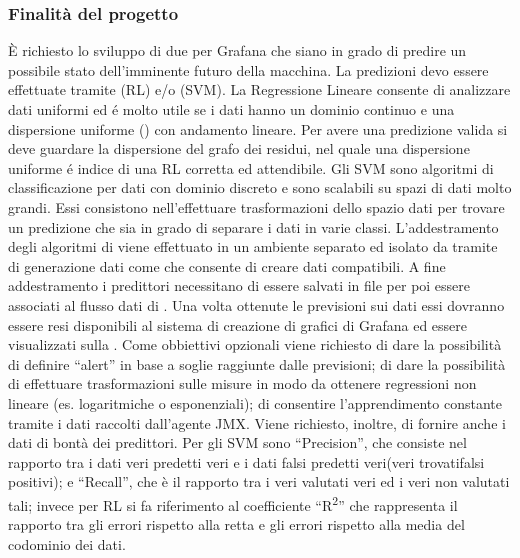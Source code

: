		\subsubsection{Finalità del progetto}
			È richiesto lo sviluppo di due  per Grafana che siano in grado di predire un possibile stato dell'imminente futuro della macchina. La predizioni devo essere effettuate tramite  (RL) e/o  (SVM).
			La Regressione Lineare consente di analizzare dati uniformi ed é molto utile se i dati hanno un dominio continuo e una dispersione uniforme () con andamento lineare. Per avere una predizione valida si deve guardare la dispersione del grafo dei residui, nel quale una dispersione uniforme é indice di una RL corretta ed attendibile.
			Gli SVM sono algoritmi di classificazione per dati con dominio discreto e sono scalabili su spazi di dati molto grandi. Essi consistono nell'effettuare trasformazioni dello spazio dati per trovare un predizione che sia in grado di separare i dati in varie classi.
			L'addestramento degli algoritmi di  viene effettuato in un ambiente separato ed isolato da  tramite  di generazione dati come  che consente di creare dati compatibili. A fine addestramento i predittori necessitano di essere salvati in file  per poi essere associati al flusso dati di . Una volta ottenute le previsioni sui dati essi dovranno essere resi disponibili al sistema di creazione di grafici di Grafana ed essere visualizzati sulla .
			\newline
			Come obbiettivi opzionali viene richiesto di dare la possibilità di definire ``alert'' in base a soglie raggiunte dalle previsioni; di dare la possibilità di effettuare trasformazioni sulle misure in modo da ottenere regressioni non lineare (es. logaritmiche o esponenziali); di consentire l'apprendimento constante tramite i dati raccolti dall'agente JMX. Viene richiesto, inoltre, di fornire anche i dati di bontà dei predittori. Per gli SVM sono ``Precision'', che consiste nel rapporto tra i dati veri predetti veri e i dati falsi predetti veri(veri trovati\/falsi positivi); e ``Recall'', che è il rapporto tra i veri valutati veri ed i veri non valutati tali; invece per RL si fa riferimento al coefficiente ``R\textsuperscript{2}'' che rappresenta il rapporto tra gli errori rispetto alla retta e gli errori rispetto alla media del codominio dei dati.


